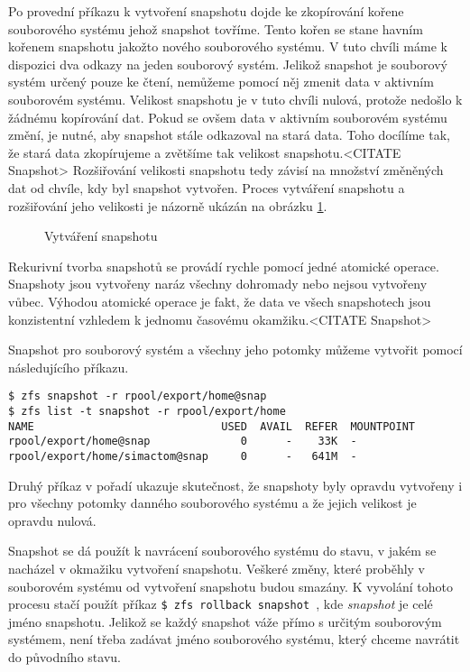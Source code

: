 Po provední příkazu k vytvoření snapshotu dojde ke zkopírování kořene souborového systému jehož snapshot tovříme. Tento kořen se stane havním kořenem snapshotu jakožto nového souborového systému. V tuto chvíli máme k dispozici dva odkazy na jeden souborový systém. Jelikož snapshot je souborový systém určený pouze ke čtení, nemůžeme pomocí něj zmenit data v aktivním souborovém systému. Velikost snapshotu je v tuto chvíli nulová, protože nedošlo k žádnému kopírování dat. Pokud se ovšem data v aktivním souborovém systému změní, je nutné, aby snapshot stále odkazoval na stará data. Toho docílíme tak, že stará data zkopírujeme a zvětšíme tak velikost snapshotu.<CITATE Snapshot> Rozšiřování velikosti snapshotu tedy závisí na množství změněných dat od chvíle, kdy byl snapshot vytvořen. Proces vytváření snapshotu a rozšiřování jeho velikosti je názorně ukázán na obrázku \ref{snapshotproces}.
\begin{figure}[h]
    \caption{Vytváření snapshotu}
    \label{snapshotproces}
\end{figure}

Rekurivní tvorba snapshotů se provádí rychle pomocí jedné atomické operace. Snapshoty jsou vytvořeny naráz všechny dohromady nebo nejsou vytvořeny vůbec. Výhodou atomické operace je fakt, že data ve všech snapshotech jsou konzistentní vzhledem k jednomu časovému okamžiku.<CITATE Snapshot>

Snapshot pro souborový systém a všechny jeho potomky můžeme vytvořit pomocí následujícího příkazu.
\begin{verbatim}
$ zfs snapshot -r rpool/export/home@snap
$ zfs list -t snapshot -r rpool/export/home
NAME                             USED  AVAIL  REFER  MOUNTPOINT
rpool/export/home@snap              0      -    33K  -
rpool/export/home/simactom@snap     0      -   641M  -
\end{verbatim}
Druhý příkaz v pořadí ukazuje skutečnost, že snapshoty byly opravdu vytvořeny i pro všechny potomky danného souborového systému a že jejich velikost je opravdu nulová.

Snapshot se dá použít k navrácení souborového systému do stavu, v jakém se nacházel v okmažiku vytvoření snapshotu. Veškeré změny, které proběhly v souborovém systému od vytvoření snapshotu budou smazány. K vyvolání tohoto procesu stačí použít příkaz \verb|$ zfs rollback snapshot |, kde \emph{snapshot} je celé jméno snapshotu. Jelikož se každý snapshot váže přímo s určitým souborovým systémem, není třeba zadávat jméno souborového systému, který chceme navrátit do původního stavu. 